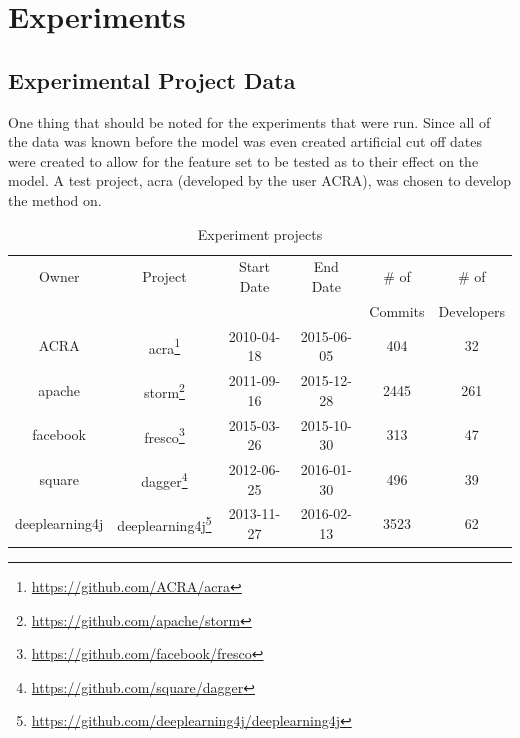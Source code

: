 \chapter{Experiments}
\label{chap:experiments}

\section{Experimental Project Data}
\label{sec:experimental_project_data}

One thing that should be noted for the experiments that were run. Since all of the data was known before the model was even created artificial cut off dates were created to allow for the feature set to be tested as to their effect on the model. A test project, acra (developed by the user ACRA), was chosen to develop the method on. 


\begin{table}[h!]
\begin{minipage}{\textwidth}
\begin{center}
    \begin{tabular}{|c|c|c|c|c|c|}
        \hline
        Owner & Project & Start Date & End Date & \# of & \# of \\
         & & & & Commits & Developers \\
        \hline
        ACRA & acra\footnote{\url{https://github.com/ACRA/acra}} & 2010-04-18 & 2015-06-05 & 404 & 32 \\
        apache & storm\footnote{\url{https://github.com/apache/storm}} & 2011-09-16 & 2015-12-28 & 2445 & 261 \\
        facebook & fresco\footnote{\url{https://github.com/facebook/fresco}} & 2015-03-26 & 2015-10-30 & 313 & 47 \\
        square & dagger\footnote{\url{https://github.com/square/dagger}} & 2012-06-25 & 2016-01-30 & 496 & 39 \\
        deeplearning4j & deeplearning4j\footnote{\url{https://github.com/deeplearning4j/deeplearning4j}} & 2013-11-27 & 2016-02-13 & 3523 & 62 \\
        \hline
    \end{tabular}
\end{center}
\caption{Experiment projects}
\label{tab:project_summary}
\end{minipage}
\end{table}

